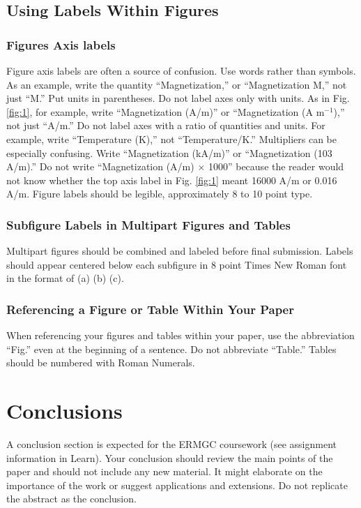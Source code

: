 \documentclass[conference]{IEEEtran}
\begin{document}
\subsection{Using Labels Within Figures} 
\subsubsection{Figures Axis labels}

Figure axis labels are often a source of confusion. Use words rather than symbols. As an example, write the quantity “Magnetization,” or “Magnetization M,” not just “M.” Put units in parentheses. Do not label axes only with units. As in Fig. \ref{fig:1}, for example, write “Magnetization (A/m)” or “Magnetization (A m$^{-1}$),” not just “A/m.” Do not label axes with a ratio of quantities and units. For example, write “Temperature (K),” not “Temperature/K.” 
Multipliers can be especially confusing. Write “Magnetization (kA/m)” or “Magnetization (103 A/m).” Do not write “Magnetization (A/m) $\times$ 1000” because the reader would not know whether the top axis label in Fig. \ref{fig:1} meant 16000 A/m or 0.016 A/m. Figure labels should be legible, approximately 8 to 10 point type.

\subsubsection{Subfigure Labels in Multipart Figures and Tables}

Multipart figures should be combined and labeled before final submission. Labels should appear centered below each subfigure in 8 point Times New Roman font in the format of (a) (b) (c). 

\subsubsection{Referencing a Figure or Table Within Your Paper}

When referencing your figures and tables within your paper, use the abbreviation “Fig.” even at the beginning of a sentence. Do not abbreviate “Table.” Tables should be numbered with Roman Numerals.

\section{Conclusions}
\label{sec:conc}

A conclusion section is expected for the ERMGC coursework (see assignment information in Learn). Your conclusion should review the main points of the paper and should not include any new material.  It might elaborate on the importance of the work or suggest applications and extensions. Do not replicate the abstract as the conclusion.
\end{document}
